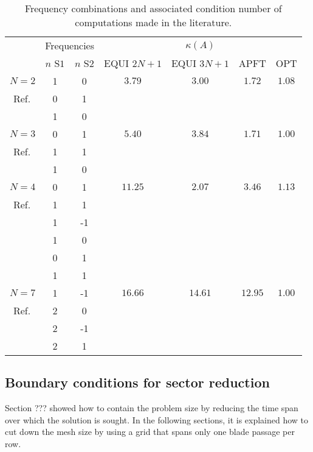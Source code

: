 \begin{table}[htbp]
  \centering
  \begin{tabular}{|r|*{6}{c|}}
    \hline
    & \multicolumn{2}{c|}{Frequencies} & \multicolumn{4}{c|}{$\kappa(A)$} \\
    \cline{2-7}
    & $n$ S$1$ & $n$ S$2$ & EQUI $2N+1$ &  EQUI $3N+1$ & APFT & OPT  \\
    \hline
    \hline
    $N=2$ & 1 & 0 & $\mathbf{3.79}$ & $3.00$ & $1.72$ & $1.08$ \\
    Ref.~\cite{gopinath2007three}& 0 & 1 & & & & \\
    \hline
    \hline
    & 1 & 0 &  & & & \\
    $N=3$& 0 & 1 &$5.40$ & $\mathbf{3.84}$ & $1.71$ & $1.00$ \\
    Ref.~\cite{Ekici2007}& 1 & 1 & & & &\\
    \hline
    \hline
    & 1 & 0 & & & & \\
    $N=4$& 0 & 1 & $\mathbf{11.25}$ & $2.07$ & $3.46$ & $1.13$ \\
    Ref.~\cite{gopinath2007three}& 1 & 1 & & & &\\
    & 1 & -1 & & & &\\
    \hline
    \hline
    & 1 & 0 & & & &\\
    & 0 & 1 & & & &\\
    & 1 & 1 & & & &\\
    $N=7$ & 1 & -1 & $\mathbf{16.66}$ & $14.61$ & $12.95$ & $1.00$ \\
    Ref.~\cite{gopinath2007three}& 2 & 0 & & & &\\
    & 2 & -1 & & & &\\
    & 2 & 1 & & & &\\
    \hline
  \end{tabular}
  \caption{Frequency combinations and associated condition number of
    computations made in the literature.}
  \label{tab:literature_multistage}
\end{table} 

\subsection{Boundary conditions for sector reduction}
\label{sec:bound-cond-sect}

Section ??? showed how to contain the problem
size by reducing the time span over which the solution is sought. In
the following sections, it is explained how to cut down the mesh size
by using a grid that spans only one blade passage per row.

